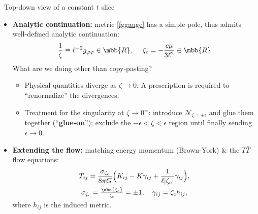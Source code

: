 \documentclass[10pt]{article}
\newcommand{\TTbar}{\texorpdfstring{\ensuremath{T\bar{T}}}{TTbar}\xspace}
\begin{document}
\begin{multicols}{3}
{\begin{center}
	\vspace{-.5\baselineskip}
	\scriptsize\ Top-down view of a constant $t$ slice
\end{center}
}

\begin{itemize}

\item \textbf{Analytic continuation:} metric \eqref{fggauge} has a simple pole, thus admits well-defined analytic continuation:
\begin{equation}
	\frac{1}{\zeta} \equiv \ell^{-2} g_{\varphi\varphi} \in \mbb{R},
\ \quad
	\zeta_c = - \frac{c \mu}{3\ell^2} \in \mbb{R}
\end{equation}
What are we doing other than copy-pasting?
	\begin{itemize}
	\item Physical quantities diverge as $\zeta \to 0$.
	A prescription is required to ``renormalize'' the divergences.
	
	\item Treatment for the singularity at $\zeta\to 0^\pm$: introduce $\mathcal N_{\zeta={\pm\epsilon}}$ and glue them together (``\textbf{glue-on}'');
		exclude the $-\epsilon < \zeta < \epsilon$ region until finally sending $\epsilon \to 0$. 
	\end{itemize}
	
\item \textbf{Extending the flow:} matching energy momentum (Brown-York) \& the \TTbar flow equations:
	\begin{equation}
	\begin{gathered}
		T_{ij}= \frac{\sigma_{\zeta_c}}{8\pi G} \Big( K_{ij} -  K \gamma_{ij} + \frac{1}{\ell |\zeta_c|}\gamma_{ij}\Big), \\ \sigma_{\zeta_c} = \tfrac{\abs{\zeta_c}}{\zeta_c} = \pm 1,\quad
		\gamma_{ij} = \zeta_c h_{ij}, \\[-1ex]
	\end{gathered}	\label{BYtensor}
	\end{equation}
	where $h_{ij}$ is the induced metric. 
	

\end{itemize}
\end{multicols}
\end{document}
